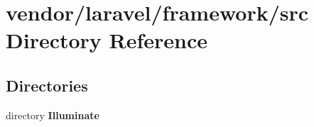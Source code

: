 \section{vendor/laravel/framework/src Directory Reference}
\label{dir_cf162ea3b9caf2059e3f257c9278c118}
\subsection*{Directories}
\begin{DoxyCompactItemize}
\item 
directory {\bf Illuminate}
\end{DoxyCompactItemize}
